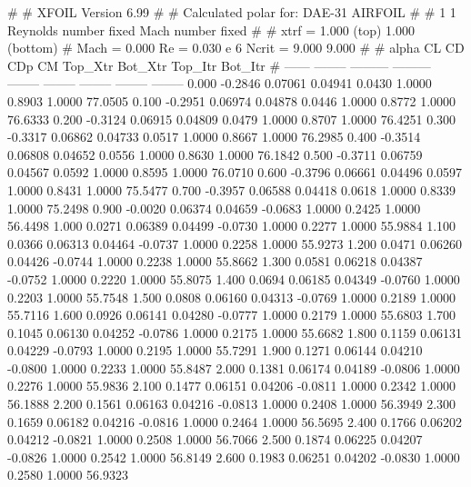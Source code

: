#  
#       XFOIL         Version 6.99
#  
# Calculated polar for: DAE-31 AIRFOIL                                  
#  
# 1 1 Reynolds number fixed          Mach number fixed         
#  
# xtrf =   1.000 (top)        1.000 (bottom)  
# Mach =   0.000     Re =     0.030 e 6     Ncrit =   9.000  9.000
#  
#   alpha    CL        CD       CDp       CM     Top_Xtr  Bot_Xtr  Top_Itr  Bot_Itr
#  ------ -------- --------- --------- -------- -------- -------- -------- --------
   0.000  -0.2846   0.07061   0.04941   0.0430   1.0000   0.8903   1.0000  77.0505
   0.100  -0.2951   0.06974   0.04878   0.0446   1.0000   0.8772   1.0000  76.6333
   0.200  -0.3124   0.06915   0.04809   0.0479   1.0000   0.8707   1.0000  76.4251
   0.300  -0.3317   0.06862   0.04733   0.0517   1.0000   0.8667   1.0000  76.2985
   0.400  -0.3514   0.06808   0.04652   0.0556   1.0000   0.8630   1.0000  76.1842
   0.500  -0.3711   0.06759   0.04567   0.0592   1.0000   0.8595   1.0000  76.0710
   0.600  -0.3796   0.06661   0.04496   0.0597   1.0000   0.8431   1.0000  75.5477
   0.700  -0.3957   0.06588   0.04418   0.0618   1.0000   0.8339   1.0000  75.2498
   0.900  -0.0020   0.06374   0.04659  -0.0683   1.0000   0.2425   1.0000  56.4498
   1.000   0.0271   0.06389   0.04499  -0.0730   1.0000   0.2277   1.0000  55.9884
   1.100   0.0366   0.06313   0.04464  -0.0737   1.0000   0.2258   1.0000  55.9273
   1.200   0.0471   0.06260   0.04426  -0.0744   1.0000   0.2238   1.0000  55.8662
   1.300   0.0581   0.06218   0.04387  -0.0752   1.0000   0.2220   1.0000  55.8075
   1.400   0.0694   0.06185   0.04349  -0.0760   1.0000   0.2203   1.0000  55.7548
   1.500   0.0808   0.06160   0.04313  -0.0769   1.0000   0.2189   1.0000  55.7116
   1.600   0.0926   0.06141   0.04280  -0.0777   1.0000   0.2179   1.0000  55.6803
   1.700   0.1045   0.06130   0.04252  -0.0786   1.0000   0.2175   1.0000  55.6682
   1.800   0.1159   0.06131   0.04229  -0.0793   1.0000   0.2195   1.0000  55.7291
   1.900   0.1271   0.06144   0.04210  -0.0800   1.0000   0.2233   1.0000  55.8487
   2.000   0.1381   0.06174   0.04189  -0.0806   1.0000   0.2276   1.0000  55.9836
   2.100   0.1477   0.06151   0.04206  -0.0811   1.0000   0.2342   1.0000  56.1888
   2.200   0.1561   0.06163   0.04216  -0.0813   1.0000   0.2408   1.0000  56.3949
   2.300   0.1659   0.06182   0.04216  -0.0816   1.0000   0.2464   1.0000  56.5695
   2.400   0.1766   0.06202   0.04212  -0.0821   1.0000   0.2508   1.0000  56.7066
   2.500   0.1874   0.06225   0.04207  -0.0826   1.0000   0.2542   1.0000  56.8149
   2.600   0.1983   0.06251   0.04202  -0.0830   1.0000   0.2580   1.0000  56.9323
